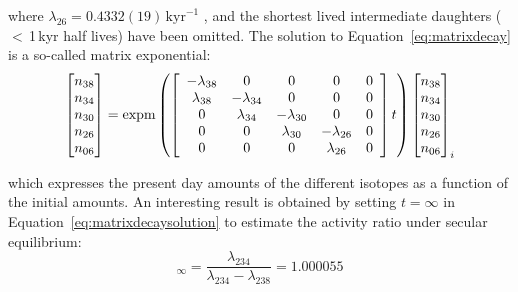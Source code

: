 \documentclass{article}
\begin{document}
\noindent where $\lambda_{26}=0.4332(19)\,\mbox{kyr}^{-1}$
\citep{audi2003}, and the shortest lived intermediate daughters
($<$\,1\,kyr half lives) have been omitted. The solution to
Equation~\ref{eq:matrixdecay} is a so-called matrix exponential:
\begin{equation}
  \left[
    \begin{array}{@{}c@{}}
      n_{38}\\
      n_{34}\\
      n_{30}\\
      n_{26}\\
      n_{06}
    \end{array}
  \right]
  =
  \mbox{expm}\left(
  \left[
    \begin{array}{ccccc}
      -\lambda_{38} & 0 & 0 & 0 & 0 \\
      \lambda_{38} & -\lambda_{34} & 0 & 0 & 0 \\
      0 & \lambda_{34} & -\lambda_{30} & 0 & 0 \\
      0 & 0 & \lambda_{30} & -\lambda_{26} & 0 \\
      0 & 0 & 0 & \lambda_{26} & 0\\
    \end{array}
    \right]
  t
  \right)
  \left[
    \begin{array}{@{}c@{}}
      n_{38}\\
      n_{34}\\
      n_{30}\\
      n_{26}\\
      n_{06}
    \end{array}
    \right]_i
  \label{eq:matrixdecaysolution}
\end{equation}

\noindent which expresses the present day amounts of the different
isotopes as a function of the initial amounts. An interesting result
is obtained by setting $t=\infty$ in
Equation~\ref{eq:matrixdecaysolution} to estimate the activity ratio
under secular equilibrium:
\begin{equation}
  [4/8]_\infty = \frac{\lambda_{234}}{\lambda_{234}-\lambda_{238}} = 1.000055
  \label{eq:secular_equilibrium}
\end{equation}
\end{document}
